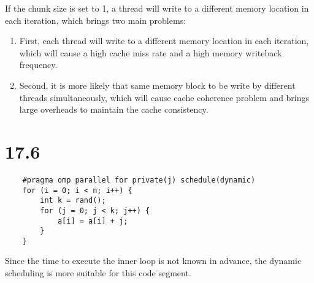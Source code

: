 If the chunk size is set to 1, a thread will write to a different memory location in each iteration, which brings two main problems:
\begin{enumerate}
    \item First, each thread will write to a different memory location in each iteration, which will cause a high cache miss rate and a high memory writeback frequency.
    \item Second, it is more likely that same memory block to be write by different threads simultaneously, which will cause cache coherence problem and brings large overheads to maintain the cache consistency.
\end{enumerate}

\section*{17.6}

\begin{lstlisting}
    #pragma omp parallel for private(j) schedule(dynamic)
    for (i = 0; i < n; i++) {
        int k = rand();
        for (j = 0; j < k; j++) {
            a[i] = a[i] + j;
        }
    }
\end{lstlisting}

Since the time to execute the inner loop is not known in advance, the dynamic scheduling is more suitable for this code segment.


